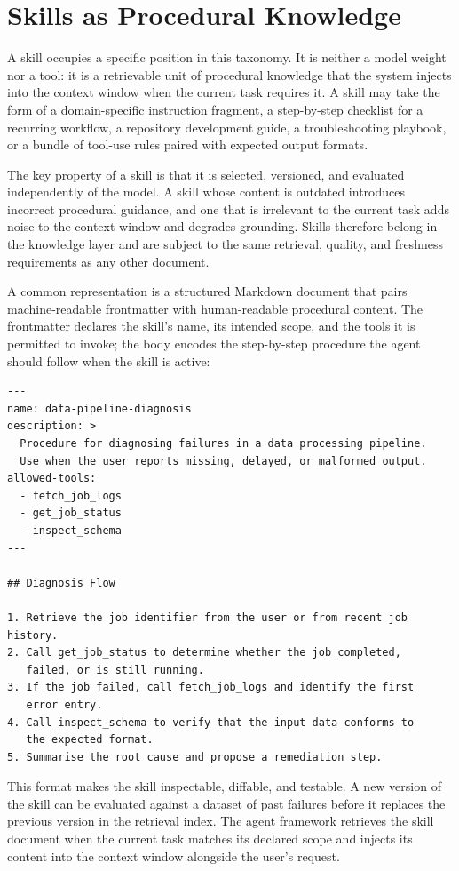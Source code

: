 \section{Skills as Procedural Knowledge}

A skill occupies a specific position in this taxonomy. It is neither a model weight nor
a tool: it is a retrievable unit of procedural knowledge that the system injects into the
context window when the current task requires it. A skill may take the form of a
domain-specific instruction fragment, a step-by-step checklist for a recurring workflow,
a repository development guide, a troubleshooting playbook, or a bundle of tool-use rules
paired with expected output formats.

The key property of a skill is that it is selected, versioned, and evaluated independently
of the model. A skill whose content is outdated introduces incorrect procedural guidance,
and one that is irrelevant to the current task adds noise to the context window and
degrades grounding. Skills therefore belong in the knowledge layer and are subject to the
same retrieval, quality, and freshness requirements as any other document.

A common representation is a structured Markdown document that pairs machine-readable
frontmatter with human-readable procedural content. The frontmatter declares the skill's
name, its intended scope, and the tools it is permitted to invoke; the body encodes the
step-by-step procedure the agent should follow when the skill is active:

\begin{lstlisting}[language={}]
---
name: data-pipeline-diagnosis
description: >
  Procedure for diagnosing failures in a data processing pipeline.
  Use when the user reports missing, delayed, or malformed output.
allowed-tools:
  - fetch_job_logs
  - get_job_status
  - inspect_schema
---

## Diagnosis Flow

1. Retrieve the job identifier from the user or from recent job history.
2. Call get_job_status to determine whether the job completed,
   failed, or is still running.
3. If the job failed, call fetch_job_logs and identify the first
   error entry.
4. Call inspect_schema to verify that the input data conforms to
   the expected format.
5. Summarise the root cause and propose a remediation step.
\end{lstlisting}

This format makes the skill inspectable, diffable, and testable. A new version of the
skill can be evaluated against a dataset of past failures before it replaces the previous
version in the retrieval index. The agent framework retrieves the skill document when the
current task matches its declared scope and injects its content into the context window
alongside the user's request.

